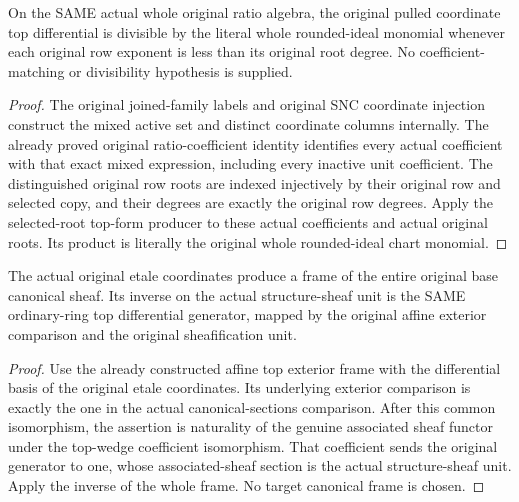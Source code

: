 \begin{lemma}
\label{lem:kn-nadel-bounded-original-ratio-root-factor}
\leanok
{}
On the SAME actual whole original ratio algebra, the original pulled
coordinate top differential is divisible by the literal whole rounded-ideal
monomial whenever each original row exponent is less than its original
root degree. No coefficient-matching or divisibility hypothesis is supplied.
\end{lemma}
\begin{proof}
The original joined-family labels and original SNC coordinate injection
construct the mixed active set and distinct coordinate columns internally.
The already proved original ratio-coefficient identity identifies every
actual coefficient with that exact mixed expression, including every
inactive unit coefficient. The distinguished original row roots are indexed
injectively by their original row and selected copy, and their degrees are
exactly the original row degrees. Apply the selected-root top-form producer
to these actual coefficients and actual original roots. Its product is
literally the original whole rounded-ideal chart monomial.
\end{proof}

\begin{lemma}
\label{lem:kn-nadel-bounded-original-source-frame}
\leanok
{}
The actual original etale coordinates produce a frame of the entire original
base canonical sheaf. Its inverse on the actual structure-sheaf unit is the
SAME ordinary-ring top differential generator, mapped by the original affine
exterior comparison and the original sheafification unit.
\end{lemma}
\begin{proof}
Use the already constructed affine top exterior frame with the differential
basis of the original etale coordinates. Its underlying exterior comparison
is exactly the one in the actual canonical-sections comparison. After this
common isomorphism, the assertion is naturality of the genuine associated
sheaf functor under the top-wedge coefficient isomorphism. That coefficient
sends the original generator to one, whose associated-sheaf section is the
actual structure-sheaf unit. Apply the inverse of the whole frame. No target
canonical frame is chosen.
\end{proof}


